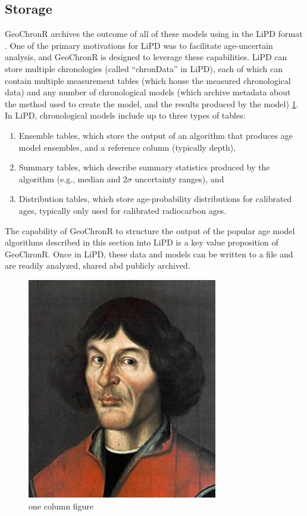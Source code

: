 \documentclass[gchron, manuscript]{copernicus}
\begin{document}
\subsection{Storage}

GeoChronR archives the outcome of all of these models using in the LiPD format \citep{lipd_cp}.
One of the primary motivations for LiPD was to facilitate age-uncertain analysis, and GeoChronR is designed to leverage these capabilities.
LiPD can store multiple chronologies (called ``chronData'' in LiPD), each of which can contain multiple measurement tables (which house the measured chronological data) and any number of chronological models (which archive metadata about the method used to create the model, and the results produced by the model) \ref{fig:lipd-chron}.
In LiPD, chronological models include up to three types of tables:

\begin{enumerate}
\def\labelenumi{\arabic{enumi}.}
\item
  Ensemble tables, which store the output of an algorithm that produces age model ensembles, and a reference column (typically depth),
\item
  Summary tables, which describe summary statistics produced by the algorithm (e.g., median and 2\(\sigma\) uncertainty ranges), and
\item
  Distribution tables, which store age-probability distributions for calibrated ages, typically only used for calibrated radiocarbon ages.
\end{enumerate}

The capability of GeoChronR to structure the output of the popular age model algorithms described in this section into LiPD is a key value proposition of GeoChronR.
Once in LiPD, these data and models can be written to a file and are readily analyzed, shared abd publicly archived.

\begin{figure}
\includegraphics[width=8.3cm]{Nikolaus_Kopernikus} \caption{one column figure}\label{fig:lipd-chron}
\end{figure}
\end{document}
